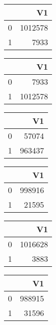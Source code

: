 \bigskip\bigskip
\centering
\begin{tabular}{rr}
  \hline
 & V1 \\ 
  \hline
0 & 1012578 \\ 
  1 & 7933 \\ 
   \hline
\end{tabular}

\bigskip\bigskip
\centering
\begin{tabular}{rr}
  \hline
 & V1 \\ 
  \hline
0 & 7933 \\ 
  1 & 1012578 \\ 
   \hline
\end{tabular}

\bigskip\bigskip
\centering
\begin{tabular}{rr}
  \hline
 & V1 \\ 
  \hline
0 & 57074 \\ 
  1 & 963437 \\ 
   \hline
\end{tabular}

\bigskip\bigskip
\centering
\begin{tabular}{rr}
  \hline
 & V1 \\ 
  \hline
0 & 998916 \\ 
  1 & 21595 \\ 
   \hline
\end{tabular}

\bigskip\bigskip
\centering
\begin{tabular}{rr}
  \hline
 & V1 \\ 
  \hline
0 & 1016628 \\ 
  1 & 3883 \\ 
   \hline
\end{tabular}

\bigskip\bigskip
\centering
\begin{tabular}{rr}
  \hline
 & V1 \\ 
  \hline
0 & 988915 \\ 
  1 & 31596 \\ 
   \hline
\end{tabular}

